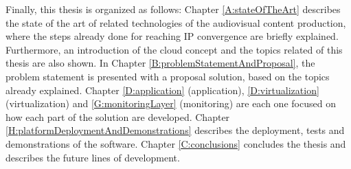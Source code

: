 Finally, this thesis is organized as follows: Chapter \ref{A:stateOfTheArt} describes the state of the art of related technologies of the audiovisual content production, where the steps already done for reaching IP convergence are briefly explained. Furthermore, an introduction of the cloud concept and the topics related of this thesis are also shown. In Chapter \ref{B:problemStatementAndProposal}, the problem statement is presented with a proposal solution, based on the topics already explained. Chapter \ref{D:application} (application), \ref{D:virtualization} (virtualization) and \ref{G:monitoringLayer} (monitoring) are each one focused on how each part of the solution are developed. Chapter \ref{H:platformDeploymentAndDemonstrations} describes the deployment, tests and demonstrations of the software. Chapter \ref{C:conclusions} concludes the thesis and describes the future lines of development.
